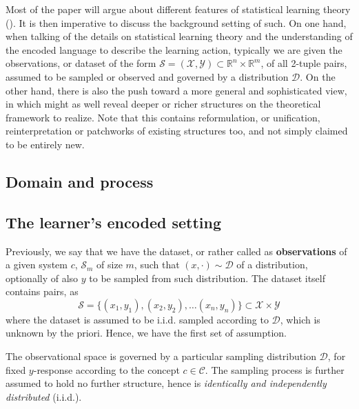 \documentclass[
  journal=largetwo,
  year=2025,
  volume=37,
]{cup-journal}
\begin{document}
Most of the paper will argue about different features of statistical learning theory (\cite{Sterkenburg_2024,Vapnik1999-VAPTNO,STL_Hajek_Maxim_2021}). It is then imperative to discuss the background setting of such. On one hand, when talking of the details on statistical learning theory and the understanding of the encoded language to describe the learning action, typically we are given the observations, or dataset of the form $\mathcal{S}=(\mathcal{X},\mathcal{Y})\subset \mathbb{R}^{n}\times \mathbb{R}^{m}$, of all 2-tuple pairs, assumed to be sampled or observed and governed by a distribution $\mathcal{D}$. On the other hand, there is also the push toward a more general and sophisticated view, in which might as well reveal deeper or richer structures on the theoretical framework to realize. Note that this contains reformulation, or unification, reinterpretation or patchworks of existing structures too, and not simply claimed to be entirely new. 

\subsection{Domain and process}



\subsection{The learner's encoded setting}

Previously, we say that we have the dataset, or rather called as \textbf{observations} of a given system $c$, $\mathcal{S}_{m}$ of size $m$, such that $(x,\cdot)\sim \mathcal{D}$ of a distribution, optionally of also $y$ to be sampled from such distribution. The dataset itself contains pairs, as
\begin{equation*}
    \mathcal{S} = \{ (x_1,y_1), (x_2, y_2),\dots(x_n,y_n) \} \subset \mathcal{X}\times \mathcal{Y}
\end{equation*}
where the dataset is assumed to be i.i.d. sampled according to $\mathcal{D}$, which is unknown by the priori. Hence, we have the first set of assumption. 
\begin{assumption}
The observational space is governed by a particular sampling distribution $\mathcal{D}$, for fixed $y$-response according to the concept $c\in \mathcal{C}$. The sampling process is further assumed to hold no further structure, hence is \textit{identically and independently distributed} (i.i.d.). 
\end{assumption}
\end{document}

